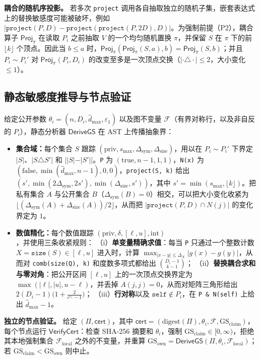 \documentclass[11pt]{article}
\newlength{\zhindent}
\newcommand{\parhead}[1]{\par\noindent\hspace*{\zhindent}\textbf{#1}}
\theoremstyle{ieeeitalic}
\newcommand{\GS}{\mathrm{GS}}
\newcommand{\dhatmax}{\hat{d}_{\max}}
\newcommand{\DeriveGS}{\mathsf{DeriveGS}}
\newcommand{\VerifyCert}{\mathsf{VerifyCert}}
\newcommand{\Proj}{\mathsf{Proj}}
\begin{document}
\parhead{耦合的随机序投影。}
若多次 \texttt{project} 调用各自抽取独立的随机子集，嵌套表达式上的替换敏感度可能被破坏，例如 $|\texttt{project}(P, D) - \texttt{project}(\texttt{project}(P, 2D), D)|$。为强制前提（P2），耦合算子 $\Proj_\pi$ 在读取 $P_i$ 之前抽取 $V$ 的一个均匀随机置换 $\pi$，并保留 $S$ 在 $\pi$ 下的前 $\lfloor k \rfloor$ 个顶点。因此当 $b \le a$ 时，$\Proj_\pi(\Proj_\pi(S, a), b) = \Proj_\pi(S, b)$；并且 $P_i \sim P_i'$ 对 $\Proj_\pi(P_i, D_i)$ 的改变至多是一次顶点交换（$|\cdot \triangle \cdot| \le 2$，大小变化 $\le 1$）。

\subsection{静态敏感度推导与节点验证}
\label{sec:cert}

给定公开参数 $\theta_i = (n, D_i, \dhatmax, \varepsilon_1)$ 以及图不变量 $\mathcal{F}$（有界对称行，以及非自反的 $P_i$），静态分析器 $\DeriveGS$ 在 AST 上传播抽象界：
\begin{itemize}
    \item \textbf{集合域：}每个集合 $S$ 跟踪 $(\mathrm{priv}, s_{\max}, \Delta_{\mathrm{sym}}, \Delta_{\mathrm{size}})$，用以在 $P_i \sim P_i'$ 下界定 $|S|$、$|S \triangle S'|$ 和 $||S|-|S'||$。\texttt{P} 为 $(\mathrm{true}, n-1, 1, 1)$，\texttt{N(x)} 为 $(\mathrm{false}, \min(\dhatmax, n-1), 0, 0)$，\texttt{project(S, k)} 给出 $(s', \min(2\Delta_{\mathrm{sym}}, 2s'), \min(\Delta_{\mathrm{size}}, s'))$，其中 $s' = \min(s_{\max}, \lfloor k \rfloor)$。把私有集合 $A$ 与公开集合 $B$（$\Delta_{\mathrm{sym}}(B)=0$）相交，可以把大小变化收紧为 $\lfloor (\Delta_{\mathrm{sym}}(A) + \Delta_{\mathrm{size}}(A))/2 \rfloor$，从而把 $|\texttt{project}(P, D) \cap N(j)|$ 的变化界定为 $1$。
    \item \textbf{数值精化：}每个数值跟踪 $(\mathrm{priv}, \delta, [\ell, u], \mathrm{int})$，并使用三条收紧规则：
    （i）\textbf{单变量精确求值}：每当 \texttt{P} 只通过一个整数计数 $X = \texttt{size}(S) \in [\ell, u]$ 进入时，计算 $\max_{|x-y|\le \Delta_X} |g(x)-g(y)|$，从而对 \texttt{comb(size(Q), k)} 和度数多项式都给出 $\binom{D_i-1}{k-1}$；
    （ii）\textbf{替换耦合求和与零对角}：把公开区间 $[\ell, u]$ 上的一次顶点交换界定为 $\max(|\ell|, |u|, u-\ell)$，并丢掉 $A(j,j)=0$，从而对矩阵三角形给出 $2(D_i-1)\bigl(1 + \frac{2}{e^{\varepsilon_1}-1}\bigr)$；
    （iii）\textbf{行对称}以及 $\texttt{self} \notin P_i$，在 \texttt{P \& N(self)} 上给出 $\dhatmax - 1$。
\end{itemize}

\parhead{独立的节点验证。}
给定 $(\Pi, \mathsf{cert})$，其中 $\mathsf{cert} = (\mathrm{digest}(\Pi), \theta_i, \mathcal{F}, \GS_{\mathrm{claim}})$，每个节点运行 $\VerifyCert$：检查 SHA-256 摘要和 $\theta_i$，强制 $\GS_{\mathrm{claim}} \in [0, \infty)$，拒绝其本地强制集合 $\mathcal{F}_{\mathrm{local}}$ 之外的不变量，并重算 $\GS_{\mathrm{own}} = \DeriveGS(\Pi, \theta_i, \mathcal{F}_{\mathrm{local}})$；若 $\GS_{\mathrm{claim}} < \GS_{\mathrm{own}}$ 则中止。
\end{document}
